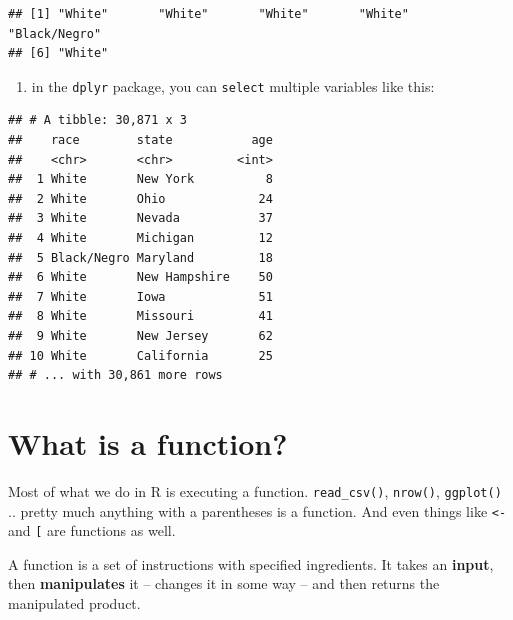 \documentclass[]{book}
\newenvironment{Shaded}{\begin{snugshade}}{\end{snugshade}}
\newcommand{\KeywordTok}[1]{\textcolor[rgb]{0.13,0.29,0.53}{\textbf{#1}}}
\newcommand{\StringTok}[1]{\textcolor[rgb]{0.31,0.60,0.02}{#1}}
\newcommand{\OperatorTok}[1]{\textcolor[rgb]{0.81,0.36,0.00}{\textbf{#1}}}
\newcommand{\NormalTok}[1]{#1}
\providecommand{\tightlist}{%
  \setlength{\itemsep}{0pt}\setlength{\parskip}{0pt}}
\theoremstyle{definition}
\theoremstyle{definition}
\theoremstyle{definition}
\theoremstyle{remark}
\begin{document}
\begin{Shaded}
\end{Shaded}

\begin{verbatim}
## [1] "White"       "White"       "White"       "White"       "Black/Negro"
## [6] "White"
\end{verbatim}

\begin{enumerate}
\def\labelenumi{\arabic{enumi}.}
\setcounter{enumi}{4}
\tightlist
\item
  in the \texttt{dplyr} package, you can \texttt{select} multiple
  variables like this:
\end{enumerate}

\begin{Shaded}
\end{Shaded}

\begin{verbatim}
## # A tibble: 30,871 x 3
##    race        state           age
##    <chr>       <chr>         <int>
##  1 White       New York          8
##  2 White       Ohio             24
##  3 White       Nevada           37
##  4 White       Michigan         12
##  5 Black/Negro Maryland         18
##  6 White       New Hampshire    50
##  7 White       Iowa             51
##  8 White       Missouri         41
##  9 White       New Jersey       62
## 10 White       California       25
## # ... with 30,861 more rows
\end{verbatim}

\section{What is a function?}\label{what-is-a-function}

Most of what we do in R is executing a function. \texttt{read\_csv()},
\texttt{nrow()}, \texttt{ggplot()} .. pretty much anything with a
parentheses is a function. And even things like \texttt{\textless{}-}
and \texttt{{[}} are functions as well.

A function is a set of instructions with specified ingredients. It takes
an \textbf{input}, then \textbf{manipulates} it -- changes it in some
way -- and then returns the manipulated product.
\end{document}

